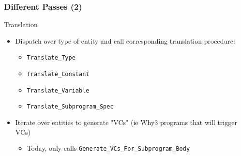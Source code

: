\documentclass{beamer}
\newenvironment{specialframe}{%
  \begin{frame}[fragile,environment=specialframe]}{\end{frame}}
\begin{document}
\begin{specialframe}\frametitle{Different Passes (2) }
   \begin{block}{Translation}
      \begin{itemize}
         \item Dispatch over type of entity and call corresponding translation
            procedure:
            \begin{itemize}
                  \item \verb|Translate_Type|
                  \item \verb|Translate_Constant|
                  \item \verb|Translate_Variable|
                  \item \verb|Translate_Subprogram_Spec|
            \end{itemize}
         \item Iterate over entities to generate "VCs" (ie Why3 programs that
            will trigger VCs)
            \begin{itemize}
               \item Today, only calls \verb|Generate_VCs_For_Subprogram_Body|
            \end{itemize}
      \end{itemize}
   \end{block}
\end{specialframe}
\end{document}
